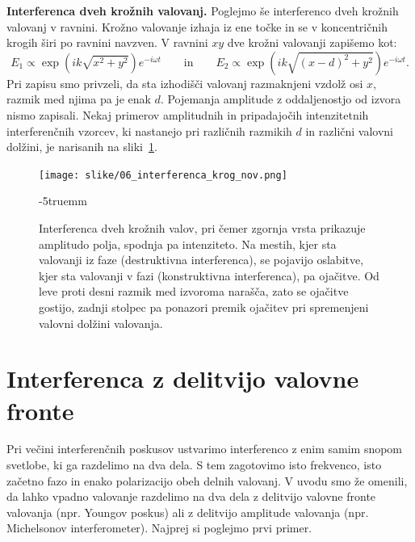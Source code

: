 \begin{example}{\bf Interferenca dveh krožnih valovanj.}
Poglejmo še interferenco dveh krožnih valovanj v ravnini. Krožno valovanje izhaja
iz ene točke in se v koncentričnih krogih širi po ravnini navzven. V
ravnini $xy$ dve krožni valovanji zapišemo kot:
\begin{equation}
E_1 \propto \exp\left( ik\sqrt{x^2+y^2}\right)  e^{-i\omega t}
\qquad \mathrm{in} \qquad
E_2 \propto \exp\left( ik\sqrt{(x-d)^2+y^2}\right)  e^{-i\omega t}.
\label{eq:06_16a}
\end{equation}
Pri zapisu smo privzeli, da sta izhodišči valovanj razmaknjeni vzdolž osi $x$, 
razmik med njima pa je enak $d$. Pojemanja amplitude
z oddaljenostjo od izvora nismo zapisali. Nekaj primerov amplitudnih in pripadajočih
intenzitetnih interferenčnih vzorcev, ki 
nastanejo pri različnih razmikih $d$ in različni valovni dolžini, 
je narisanih na sliki~\ref{fig:06_intkrog}.
\begin{figure}[!ht]
\centering
\texttt{[image: slike/06\_interferenca\_krog\_nov.png]}
\caption{Interferenca dveh krožnih valov, pri čemer zgornja vrsta prikazuje 
amplitudo polja, spodnja pa intenziteto. Na mestih, kjer sta valovanji iz faze (destruktivna
interferenca), se pojavijo oslabitve, kjer sta valovanji v fazi (konstruktivna interferenca),
pa ojačitve. Od leve proti desni razmik med izvoroma narašča, zato se ojačitve gostijo, zadnji 
stolpec pa ponazori premik ojačitev pri spremenjeni valovni dolžini valovanja.}
\label{fig:06_intkrog}
\vglue-5truemm
\end{figure}

\end{example}

\section{Interferenca z delitvijo valovne fronte}
\label{chap:Young}
Pri večini interferenčnih poskusov ustvarimo interferenco z enim samim 
snopom svetlobe, ki ga razdelimo na dva dela. S tem zagotovimo isto 
frekvenco, isto začetno fazo in enako polarizacijo obeh delnih valovanj. V uvodu smo
že omenili, da lahko vpadno valovanje razdelimo na dva dela z delitvijo 
valovne fronte valovanja (npr. Youngov poskus) ali z delitvijo amplitude
valovanja (npr. Michelsonov interferometer). Najprej si poglejmo prvi primer.

